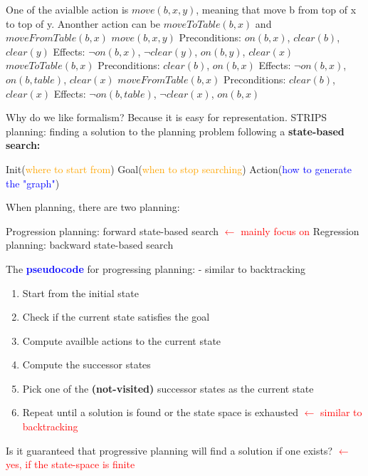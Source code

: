 \noindent
One of the avialble action is $move(b,x,y)$, meaning that move b from top of x to top of y. Anonther action can be $moveToTable(b,x)$ and $moveFromTable(b,x)$
\tabto{0mm} $move(b,x,y)$
\tabto{5mm} Preconditions:
\tabto{10mm} $on(b,x)$, $clear(b)$, $clear(y)$
\tabto{5mm} Effects:
\tabto{10mm} $\neg on(b,x)$, $\neg clear(y)$, $on(b,y)$, $clear(x)$ 
\tabto{0mm} $moveToTable(b,x)$
\tabto{5mm} Preconditions:
\tabto{10mm} $clear(b)$, $on(b,x)$
\tabto{5mm} Effects:
\tabto{10mm} $\neg on(b,x)$, $on(b,table)$, $clear(x)$
\tabto{0mm} $moveFromTable(b,x)$
\tabto{5mm} Preconditions:
\tabto{10mm} $clear(b)$, $clear(x)$
\tabto{5mm} Effects:
\tabto{10mm} $\neg on(b,table)$, $\neg clear(x)$, $on(b,x)$

\noindent
Why do we like formalism? Because it is easy for representation. STRIPS planning: finding a solution to the planning problem following a \textbf{state-based search:}
\begin{outline}
    \1 Init(\textcolor{orange}{where to start from})
    \1 Goal(\textcolor{orange}{when to stop searching})
    \1 Action(\textcolor{blue}{how to generate the "graph"})
\end{outline}

\noindent
When planning, there are two planning: 
\begin{outline}
    \1 Progression planning: forward state-based search \textcolor{red}{$\leftarrow$ mainly focus on}
    \1 Regression planning: backward state-based search
\end{outline}

\noindent 
The \textbf{\textcolor{blue}{pseudocode}} for progressing planning: - similar to backtracking
\begin{enumerate}
    \item Start from the initial state
    \item Check if the current state satisfies the goal
    \item Compute availble actions to the current state
    \item Compute the successor states
    \item Pick one of the \textbf{(not-visited)} successor states as the current state
    \item Repeat until a solution is found or the state space is exhausted \textcolor{red}{$\leftarrow$ similar to backtracking}
\end{enumerate}

\noindent
Is it guaranteed that progressive planning will find a solution if one exists? \textcolor{red}{$\leftarrow$ yes, if the state-space is finite} 

